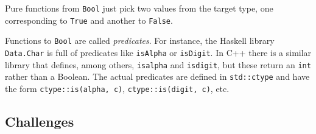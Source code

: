 Pure functions from \texttt{Bool} just pick two values from the target
type, one corresponding to \texttt{True} and another to \texttt{False}.

Functions to \texttt{Bool} are called \emph{predicates}. For instance,
the Haskell library \texttt{Data.Char} is full of predicates like
\texttt{isAlpha} or \texttt{isDigit}. In C++ there is a similar library
\texttt{} that defines, among others, \texttt{isalpha} and
\texttt{isdigit}, but these return an \texttt{int} rather than a
Boolean. The actual predicates are defined in \texttt{std::ctype} and
have the form \texttt{ctype::is(alpha,\ c)},
\texttt{ctype::is(digit,\ c)}, etc.

\subsection{Challenges}\label{challenges}

